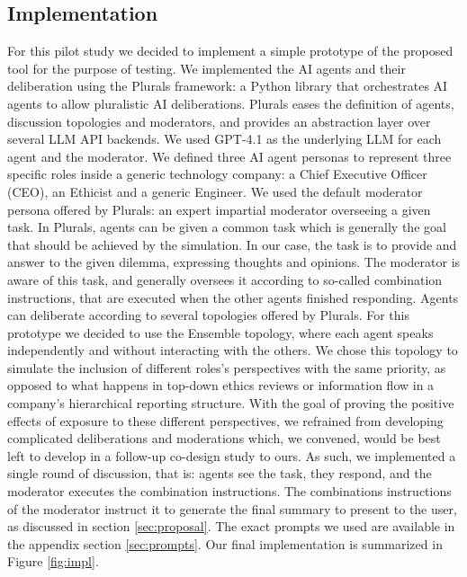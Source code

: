\subsection{Implementation}
\label{sec:implementation}

For this pilot study we decided to implement a simple prototype of the proposed tool for the purpose of testing.
We implemented the AI agents and their deliberation using the Plurals \cite{ashkinaze2025pluralsguidingllmssimulated} framework: a Python library that orchestrates AI agents to allow pluralistic AI deliberations.
Plurals eases the definition of agents, discussion topologies and moderators, and provides an abstraction layer over several LLM API backends.
We used GPT-4.1 as the underlying LLM for each agent and the moderator.
We defined three AI agent personas to represent three specific roles inside a generic technology company: a Chief Executive Officer (CEO), an Ethicist and a generic Engineer.
We used the default moderator persona offered by Plurals: an expert impartial moderator overseeing a given task.
In Plurals, agents can be given a common task which is generally the goal that should be achieved by the simulation.
In our case, the task is to provide and answer to the given dilemma, expressing thoughts and opinions.
The moderator is aware of this task, and generally oversees it according to so-called combination instructions, that are executed when the other agents finished responding.
Agents can deliberate according to several topologies offered by Plurals.
For this prototype we decided to use the Ensemble topology, where each agent speaks independently and without interacting with the others.
We chose this topology to simulate the inclusion of different roles's perspectives with the same priority, as opposed to what happens in top-down ethics reviews or information flow in a company's hierarchical reporting structure.
With the goal of proving the positive effects of exposure to these different perspectives, we refrained from developing complicated deliberations and moderations which, we convened, would be best left to develop in a follow-up co-design study to ours.
As such, we implemented a single round of discussion, that is: agents see the task, they respond, and the moderator executes the combination instructions.
The combinations instructions of the moderator instruct it to generate the final summary to present to the user, as discussed in section \ref{sec:proposal}.
The exact prompts we used are available in the appendix section \ref{sec:prompts}.
Our final implementation is summarized in Figure \ref{fig:impl}.

